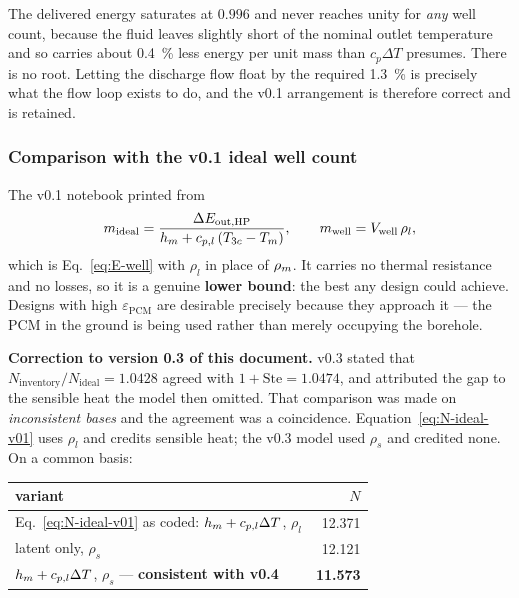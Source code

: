 \noindent The delivered energy saturates at $0.996$ and never reaches unity for
\emph{any} well count, because the fluid leaves slightly short of the nominal
outlet temperature and so carries about \SI{0.4}{\percent} less energy per unit
mass than $c_{p}\Delta T$ presumes. There is no root. Letting the discharge flow
float by the required \SI{1.3}{\percent} is precisely what the flow loop exists
to do, and the v0.1 arrangement is therefore correct and is retained.

\subsubsection*{Comparison with the v0.1 ideal well count}
\label{sec:hydraulics:ideal}

The v0.1 notebook printed  from
\begin{equation}
  m_{\mathrm{ideal}}
  = \frac{\Delta E_{\mathrm{out,HP}}}{h_{m} + c_{p,l}\left(T_{3c}-T_{m}\right)},
  \qquad
  m_{\mathrm{well}} = V_{\mathrm{well}}\,\rho_{l},
  \label{eq:N-ideal-v01}
\end{equation}
which is Eq.~\eqref{eq:E-well} with $\rho_{l}$ in place of $\rho_{m}$. It carries
no thermal resistance and no losses, so it is a genuine \textbf{lower bound}:
the best any design could achieve. Designs with high
$\varepsilon_{\mathrm{PCM}}$ are desirable precisely because they approach it
--- the PCM in the ground is being used rather than merely occupying the
borehole.

\medskip
\noindent\textbf{Correction to version 0.3 of this document.} v0.3 stated that
$N_{\mathrm{inventory}}/N_{\mathrm{ideal}} = 1.0428$ agreed with
$1+\mathrm{Ste} = 1.0474$, and attributed the gap to the sensible heat the model
then omitted. That comparison was made on \emph{inconsistent bases} and the
agreement was a coincidence. Equation~\eqref{eq:N-ideal-v01} uses $\rho_{l}$ and
credits sensible heat; the v0.3 model used $\rho_{s}$ and credited none. On a
common basis:

\begin{center}
\begin{tabular}{@{}l r@{}}
\toprule
variant & $N$ \\
\midrule
Eq.~\eqref{eq:N-ideal-v01} as coded: $h_{m}+c_{p,l}\Delta T$, $\rho_{l}$ & 12.371 \\
latent only, $\rho_{s}$ & 12.121 \\
$h_{m}+c_{p,l}\Delta T$, $\rho_{s}$ --- \textbf{consistent with v0.4} & \textbf{11.573} \\
\bottomrule
\end{tabular}
\end{center}

